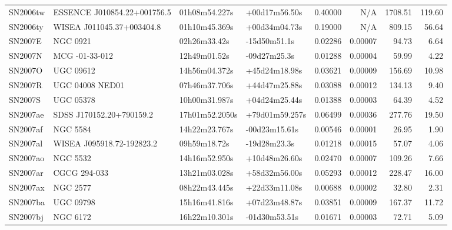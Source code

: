 \begin{longtable}{llllrrrr}
SN2006tw         &     ESSENCE J010854.22+001756.5 &   01h08m54.227s &   +00d17m56.50s &  0.40000 &      N/A &  1708.51 &      119.60 \\
SN2006ty         &       WISEA J011045.37+003404.8 &   01h10m45.369s &   +00d34m04.73s &  0.19000 &      N/A &   809.15 &       56.64 \\
SN2007E          &                        NGC 0921 &    02h26m33.42s &    -15d50m51.1s &  0.02286 &  0.00007 &    94.73 &        6.64 \\
SN2007N          &                  MCG -01-33-012 &    12h49m01.52s &    -09d27m25.3s &  0.01288 &  0.00004 &    59.99 &        4.22 \\
SN2007O          &                       UGC 09612 &   14h56m04.372s &   +45d24m18.98s &  0.03621 &  0.00009 &   156.69 &       10.98 \\
SN2007R          &                 UGC 04008 NED01 &   07h46m37.706s &   +44d47m25.88s &  0.03088 &  0.00012 &   134.13 &        9.40 \\
SN2007S          &                       UGC 05378 &   10h00m31.987s &   +04d24m25.44s &  0.01388 &  0.00003 &    64.39 &        4.52 \\
SN2007ae         &        SDSS J170152.20+790159.2 &  17h01m52.2050s &  +79d01m59.257s &  0.06499 &  0.00036 &   277.76 &       19.50 \\
SN2007af         &                        NGC 5584 &   14h22m23.767s &   -00d23m15.61s &  0.00546 &  0.00001 &    26.95 &        1.90 \\
SN2007al         &       WISEA J095918.72-192823.2 &    09h59m18.72s &    -19d28m23.3s &  0.01218 &  0.00015 &    57.07 &        4.06 \\
SN2007ao         &                        NGC 5532 &   14h16m52.950s &   +10d48m26.60s &  0.02470 &  0.00007 &   109.26 &        7.66 \\
SN2007ar         &                    CGCG 294-033 &   13h21m03.028s &   +58d32m56.00s &  0.05293 &  0.00012 &   228.47 &       16.00 \\
SN2007ax         &                        NGC 2577 &   08h22m43.445s &   +22d33m11.08s &  0.00688 &  0.00002 &    32.80 &        2.31 \\
SN2007ba         &                       UGC 09798 &   15h16m41.816s &   +07d23m48.87s &  0.03851 &  0.00009 &   167.37 &       11.72 \\
SN2007bj         &                        NGC 6172 &   16h22m10.301s &   -01d30m53.51s &  0.01671 &  0.00003 &    72.71 &        5.09 \\

\end{longtable}
